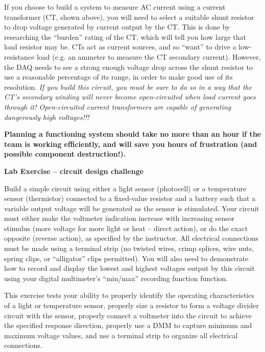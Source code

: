 \begin{itemize}
If you choose to build a system to measure AC current using a current transformer (CT, shown above), you will need to select a suitable shunt resistor to drop voltage generated by current output by the CT.  This is done by researching the ``burden'' rating of the CT, which will tell you how large that load resistor may be.  CTs act as current sources, and so ``want'' to drive a low-resistance load (e.g. an ammeter to measure the CT secondary current).  However, the DAQ needs to see a strong enough voltage drop across the shunt resistor to use a reasonable percentage of its range, in order to make good use of its resolution.  {\it If you build this circuit, you must be sure to do so in a way that the CT's secondary winding will never become open-circuited when load current goes through it!  Open-circuited current transformers are capable of generating dangerously high voltages!!!}

\vskip 10pt

{\bf Planning a functioning system should take no more than an hour if the team is working efficiently, and will save you hours of frustration (and possible component destruction!).}




\vfil \eject

\noindent
{\bf Lab Exercise -- circuit design challenge}

\vskip 5pt

Build a simple circuit using either a light sensor (photocell) or a temperature sensor (thermistor) connected to a fixed-value resistor and a battery such that a variable output voltage will be generated as the sensor is stimulated.  Your circuit must either make the voltmeter indication increase with increasing sensor stimulus (more voltage for more light or heat -- direct action), or do the exact opposite (reverse action), as specified by the instructor.  All electrical connections must be made using a terminal strip (no twisted wires, crimp splices, wire nuts, spring clips, or ``alligator'' clips permitted).  You will also need to demonstrate how to record and display the lowest and highest voltages output by this circuit using your digital multimeter's ``min/max'' recording function function.

This exercise tests your ability to properly identify the operating characteristics of a light or temperature sensor, properly size a resistor to form a voltage divider circuit with the sensor, properly connect a voltmeter into the circuit to achieve the specified response direction, properly use a DMM to capture minimum and maximum voltage values, and use a terminal strip to organize all electrical connections.


\end{itemize}
